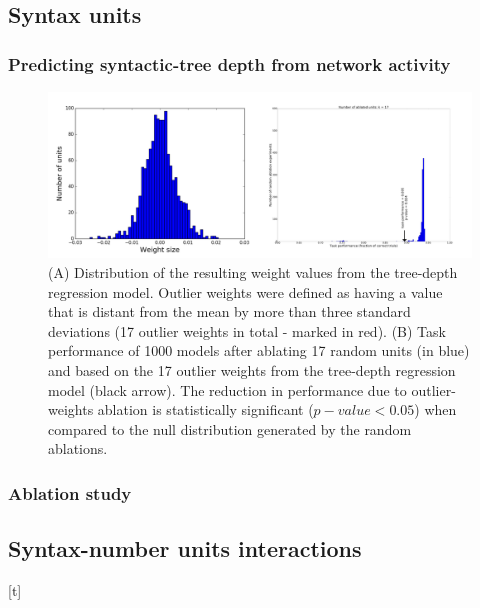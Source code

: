 \subsection{Syntax units}
\lipsum[1]

\subsubsection{Predicting syntactic-tree depth from network activity}
\lipsum[1]
\begin{figure}[b]
\centering
\includegraphics[width=\linewidth]{Figures/Figure6_regression.png}
\caption{(A) Distribution of the resulting weight values from the tree-depth regression model. Outlier weights were defined as having a value that is distant from the mean by more than three standard deviations (17 outlier weights in total - marked in red). (B) Task performance of 1000 models after ablating 17 random units (in blue) and based on the 17 outlier weights from the tree-depth regression model (black arrow). The reduction in performance due to outlier-weights ablation is statistically significant ($p-value < 0.05$) when compared to the null distribution generated by the random ablations.}
\end{figure}

\subsubsection{Ablation study}
\lipsum[1]

\subsection{Syntax-number units interactions}[t]
\lipsum[1]

